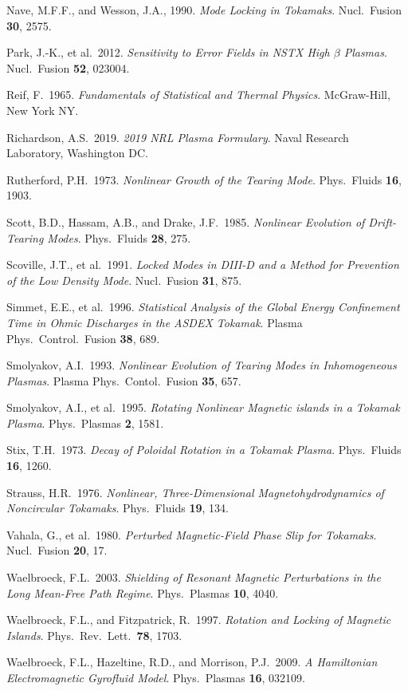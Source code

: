 \documentclass[notitlepage,12pt]{article}
\begin{document}
\begin{description}
\item Nave, M.F.F., and Wesson, J.A., 1990. {\em Mode Locking in Tokamaks}. Nucl.\ Fusion {\bf 30}, 2575. 
\item Park, J.-K., et al.\ 2012. {\em  Sensitivity to Error Fields in NSTX High $\beta$ Plasmas}. Nucl.\ Fusion {\bf 52}, 023004. 
\item Reif, F.\ 1965. {\em Fundamentals of Statistical and Thermal Physics}. McGraw-Hill, New York NY. 
\item Richardson, A.S.\ 2019. {\em 2019 NRL Plasma Formulary}.  Naval Research Laboratory, Washington DC. 
\item Rutherford, P.H.\ 1973. {\em Nonlinear Growth of the Tearing Mode}. Phys.\ Fluids {\bf 16}, 1903. 
\item Scott, B.D., Hassam, A.B., and Drake, J.F.\ 1985. {\em Nonlinear Evolution of Drift-Tearing Modes}. Phys.\ Fluids
{\bf 28}, 275. 
\item Scoville, J.T., et al.\ 1991. {\em Locked Modes in DIII-D and a Method for Prevention of the Low Density Mode}. Nucl.\ Fusion {\bf 31}, 875. 
\item Simmet, E.E., et al.\ 1996. {\em Statistical Analysis of the Global Energy Confinement Time in Ohmic Discharges in the ASDEX Tokamak}. Plasma Phys.\ Control.\ Fusion {\bf 38}, 689.
\item Smolyakov, A.I.\ 1993. {\em Nonlinear Evolution of Tearing Modes in Inhomogeneous Plasmas}. Plasma Phys.\ Contol.\ Fusion 
{\bf 35}, 657. 
\item Smolyakov, A.I., et al.\ 1995. {\em Rotating Nonlinear Magnetic islands in a Tokamak Plasma}. Phys.\ Plasmas {\bf 2}, 1581.
\item Stix, T.H.\ 1973. {\em Decay of Poloidal Rotation in a Tokamak Plasma}. Phys.\ Fluids {\bf 16}, 1260.
\item Strauss, H.R.\ 1976. {\em Nonlinear, Three-Dimensional Magnetohydrodynamics of  Noncircular Tokamaks}. Phys.\ Fluids {\bf 19},  134.
\item Vahala, G., et al.\ 1980. {\em Perturbed Magnetic-Field Phase Slip for Tokamaks}. Nucl.\ Fusion {\bf 20}, 17.
\item Waelbroeck, F.L.\ 2003. {\em Shielding of Resonant Magnetic Perturbations in the Long Mean-Free Path Regime}. Phys.\ Plasmas {\bf 10}, 4040.
\item Waelbroeck, F.L., and Fitzpatrick, R.\ 1997. {\em Rotation and Locking of Magnetic Islands}. Phys.\ Rev.\ Lett.\ {\bf 78}, 1703. 
\item Waelbroeck, F.L., Hazeltine, R.D., and Morrison, P.J.\ 2009. {\em A Hamiltonian Electromagnetic Gyrofluid Model}. Phys.\ Plasmas {\bf 16}, 032109. 

\end{description}
\end{document}
